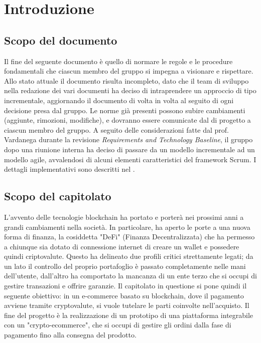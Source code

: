\section{Introduzione} \label{section: introduzione}

\subsection {Scopo del documento} \label{subsection:scopo}
Il fine del seguente documento è quello di normare le regole e le procedure fondamentali che ciascun membro del gruppo \groupName{} si impegna a visionare e rispettare.
Allo stato attuale il documento risulta incompleto, dato che il team di sviluppo nella redazione dei vari documenti ha deciso di intraprendere un approccio di tipo incrementale, aggiornando il documento di volta in volta al seguito di ogni decisione presa dal gruppo.
Le norme già presenti possono subire cambiamenti (aggiunte, rimozioni, modifiche), e dovranno essere comunicate dal \roleProjectManagerLow{} di progetto a ciascun membro del gruppo.
A seguito delle considerazioni fatte dal prof. Vardanega durante la revisione \textit{Requirements and Technology Baseline}, il gruppo \groupName{} dopo una riunione interna ha deciso di passare da un modello incrementale ad un modello agile, avvalendosi di alcuni elementi caratteristici del framework Scrum\glo{}. I dettagli implementativi sono descritti nel \docNameVersionPdP{}.
\vspace{1cm}

\subsection{Scopo del capitolato}
L'avvento delle tecnologie blockchain\glo{} ha portato e porterà nei prossimi anni a grandi cambiamenti nella società.
In particolare, ha aperto le porte a una nuova forma di finanza, la cosiddetta "DeFi" (Finanza Decentralizzata) che ha permesso a chiunque sia dotato di connessione internet di creare un wallet\glo{} e possedere quindi criptovalute\glo{}.
Questo ha delineato due profili critici strettamente legati; da un lato il controllo del proprio portafoglio è passato completamente nelle mani dell'utente, dall'altro ha comportato la mancanza di un ente terzo che si occupi di gestire transazioni e offrire garanzie.
\newline
Il capitolato in questione si pone quindi il seguente obiettivo: in un e-commerce\glo{} basato su blockchain\glo{}, dove il pagamento avviene tramite cryptovalute\glo{}, si vuole tutelare le parti coinvolte nell'acquisto.
\newline
Il fine del progetto è la realizzazione di un prototipo di una piattaforma integrabile con un "crypto-ecommerce\glo{}", che si occupi di gestire gli ordini dalla fase di pagamento fino alla consegna del prodotto.

